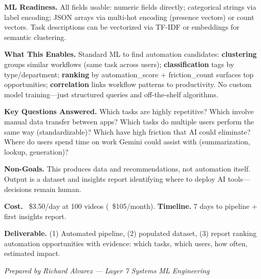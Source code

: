 \documentclass[9pt]{article}
\begin{document}
\smallskip
\textbf{ML Readiness.} All fields usable: numeric fields directly; categorical strings via label encoding; JSON arrays via multi-hot encoding (presence vectors) or count vectors. Task descriptions can be vectorized via TF-IDF or embeddings for semantic clustering.

\textbf{What This Enables.}
Standard ML to find automation candidates: \textbf{clustering} groups similar workflows (same task across users); \textbf{classification} tags by type/department; \textbf{ranking} by automation\_score + friction\_count surfaces top opportunities; \textbf{correlation} links workflow patterns to productivity. No custom model training—just structured queries and off-the-shelf algorithms.

\textbf{Key Questions Answered.}
Which tasks are highly repetitive? Which involve manual data transfer between apps? Which tasks do multiple users perform the same way (standardizable)? Which have high friction that AI could eliminate? Where do users spend time on work Gemini could assist with (summarization, lookup, generation)?

\textbf{Non-Goals.}
This produces data and recommendations, not automation itself. Output is a dataset and insights report identifying where to deploy AI tools—decisions remain human.

\textbf{Cost.} ~\$3.50/day at 100 videos (~\$105/month). \textbf{Timeline.} 7 days to pipeline + first insights report.

\textbf{Deliverable.}
(1) Automated pipeline, (2) populated dataset, (3) report ranking automation opportunities with evidence: which tasks, which users, how often, estimated impact.

\vfill
{\small\itshape Prepared by Richard Alvarez — Layer 7 Systems ML Engineering}
\end{document}
